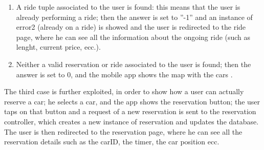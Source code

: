 \documentclass{article}
\begin{document}
\begin{flushleft}
\begin{enumerate}
\item A ride tuple associated to the user is found: this means that the user is already performing a ride; then the answer is set to ''-1'' and an instance of error2 (already on a ride) is showed and the user is redirected to the ride page, where he can see all the information about the ongoing ride (such as lenght, current price, ecc.).
\item Neither a valid reservation or ride associated to the user is found; then the answer is set to 0, and the mobile app shows the map with the cars . 
\end{enumerate} 
The third case is further exploited, in order to show how a user can actually reserve a car; he selects a car, and the app shows the reservation button; the user taps on that button and a request of a new reservation is sent to the reservation controller, which creates a new instance of reservation and updates the database. The user is then redirected to the reservation page, where he can see all the reservation details such as the carID, the timer, the car position ecc.



\end{flushleft}
\end{document}
